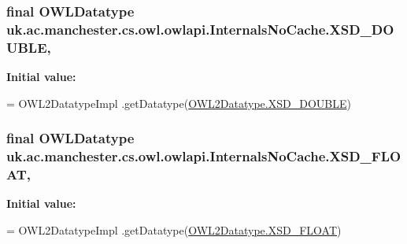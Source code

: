 \hypertarget{classuk_1_1ac_1_1manchester_1_1cs_1_1owl_1_1owlapi_1_1_internals_no_cache_a64dc0abf5125754767c833d0b73a9df4}{
\subsubsection[{X\-S\-D\-\_\-\-D\-O\-U\-B\-L\-E}]{\setlength{\rightskip}{0pt plus 5cm}final {\bf O\-W\-L\-Datatype} uk.\-ac.\-manchester.\-cs.\-owl.\-owlapi.\-Internals\-No\-Cache.\-X\-S\-D\-\_\-\-D\-O\-U\-B\-L\-E\hspace{0.3cm}{\ttfamily [static]}, {\ttfamily [private]}}}\label{classuk_1_1ac_1_1manchester_1_1cs_1_1owl_1_1owlapi_1_1_internals_no_cache_a64dc0abf5125754767c833d0b73a9df4}
{\bfseries Initial value\-:}
\begin{DoxyCode}
= OWL2DatatypeImpl
            .getDatatype(\hyperlink{enumorg_1_1semanticweb_1_1owlapi_1_1vocab_1_1_o_w_l2_datatype_a80ce5bae36f5e311c088eda4bb985ece}{OWL2Datatype.XSD\_DOUBLE})
\end{DoxyCode}
\hypertarget{classuk_1_1ac_1_1manchester_1_1cs_1_1owl_1_1owlapi_1_1_internals_no_cache_ac40f4b025bf7c58a2837e7d173fbe5fd}{
\subsubsection[{X\-S\-D\-\_\-\-F\-L\-O\-A\-T}]{\setlength{\rightskip}{0pt plus 5cm}final {\bf O\-W\-L\-Datatype} uk.\-ac.\-manchester.\-cs.\-owl.\-owlapi.\-Internals\-No\-Cache.\-X\-S\-D\-\_\-\-F\-L\-O\-A\-T\hspace{0.3cm}{\ttfamily [static]}, {\ttfamily [private]}}}\label{classuk_1_1ac_1_1manchester_1_1cs_1_1owl_1_1owlapi_1_1_internals_no_cache_ac40f4b025bf7c58a2837e7d173fbe5fd}
{\bfseries Initial value\-:}
\begin{DoxyCode}
= OWL2DatatypeImpl
            .getDatatype(\hyperlink{enumorg_1_1semanticweb_1_1owlapi_1_1vocab_1_1_o_w_l2_datatype_acc56037450b8080e2d99149db190b7fd}{OWL2Datatype.XSD\_FLOAT})
\end{DoxyCode}
